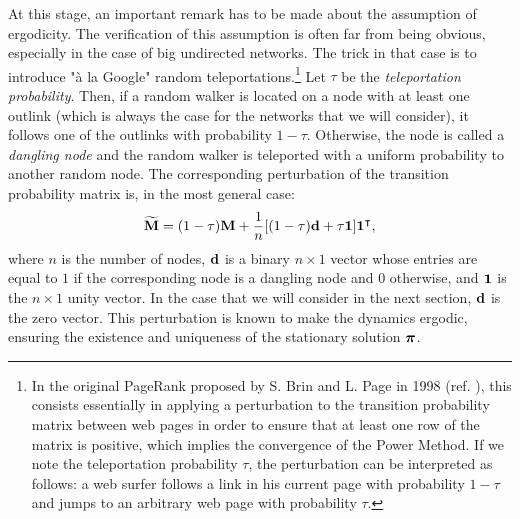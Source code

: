 At this stage, an important remark has to be made about the assumption of ergodicity. The verification of this assumption is often far from being obvious, especially in the case of big undirected networks. The trick in that case is to introduce "à la Google" random teleportations.\footnote{In the original PageRank proposed by S. Brin and L. Page in 1998 (ref. \cite{grin1998anatomy}), this consists essentially in applying a perturbation to the transition probability matrix between web pages in order to ensure that at least one row of the matrix is positive, which implies the convergence of the Power Method. If we note the teleportation probability $\tau$, the perturbation can be interpreted as follows: a web surfer follows a link in his current page with probability $1-\tau$ and jumps to an arbitrary web page with probability $\tau$.} Let $\tau$ be the \textit{teleportation probability}. Then, if a random walker is located on a node with at least one outlink (which is always the case for the networks that we will consider), it follows one of the outlinks with probability $1-\tau$. Otherwise, the node is called a \textit{dangling node} and the random walker is teleported with a uniform probability to another random node. The corresponding perturbation of the transition probability matrix is, in the most general case:
\begin{equation} \label{eq:M_teleport}
	\widetilde{\mathbf M} = (1-\tau)\mathbf M + \frac{1}{n}[(1-\tau)\mathbf d + \tau \mathbf 1]\mathbf 1^{\intercal},
\end{equation}
where $n$ is the number of nodes, $\mathbf d$ is a binary $n \times 1$ vector whose entries are equal to $1$ if the corresponding node is a dangling node and $0$ otherwise, and $\mathbf 1$ is the $n \times 1$ unity vector. In the case that we will consider in the next section, $\mathbf d$ is the zero vector. This perturbation is known to make the dynamics ergodic, ensuring the existence and uniqueness of the stationary solution $\boldsymbol \pi$.